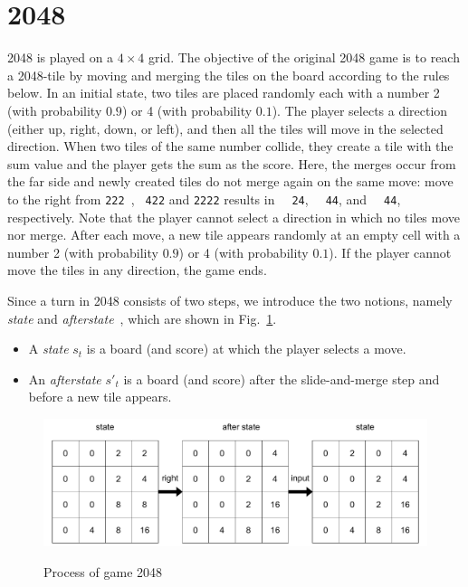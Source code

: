\section{2048}

2048 is played on a $4 \times 4$ grid.
The objective of the original 2048 game is to reach a 2048-tile by moving and merging
the tiles on the board according to the rules below.
In an initial state, two tiles are placed randomly each with a number 2 (with probability $0.9$) or 4 (with probability $0.1$).
The player selects a direction (either up, right, down, or left), and then all the tiles will move in the selected direction.
When two tiles of the same number collide, they create a tile with the sum value and the player gets the sum as the score.
Here, the merges occur from the far side and newly created tiles do not merge again on the same move: move to the right from \verb*|222 |, \verb*| 422| and \verb*|2222| results in
\verb*|  24|, \verb*|  44|, and \verb*|  44|, respectively.
Note that the player cannot select a direction in which no tiles move nor merge.
After each move, a new tile appears randomly at an empty cell with a number 2 (with probability $0.9$) or 4 (with probability $0.1$).
If the player cannot move the tiles in any direction, the game ends.

Since a turn in 2048 consists of two steps, we introduce the two notions, namely \emph{state} and \emph{afterstate}~\cite{SzJa14}, which are shown in Fig.~\ref{fig:states-and-afterstates}.
\begin{itemize}
 \item A \emph{state} $s_t$ is a board (and score) at which the player selects a move.
 \item An \emph{afterstate} $s'_t$ is a board (and score) after the slide-and-merge step and before a new tile appears.
\end{itemize}

\begin{figure}[t]
  \begin{center}
    \includegraphics[width=.95\linewidth]{figures/state_afterstate.pdf}\\[5pt]
  \end{center}
 \caption{Process of game 2048}
 \label{fig:states-and-afterstates}
\end{figure}


